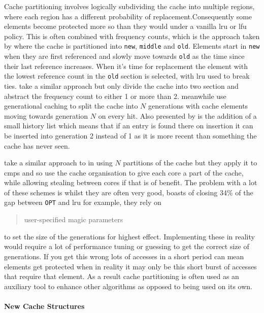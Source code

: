 Cache partitioning involves logically subdividing the cache into multiple regions, where each region has a different probability of replacement.Consequently some elements become protected more so than they would under a vanilla \gls{lru} or \gls{lfu} policy. This is often combined with frequency counts, which is the approach taken by \citet{robinsonDataCacheManagement1990} where the cache is partitioned into \texttt{new}, \texttt{middle} and \texttt{old}. Elements start in \texttt{new} when they are first referenced and slowly move towards \texttt{old} as the time since their last reference increases. When it's time for replacement the element with the lowest reference count in the \texttt{old} section is selected, with \gls{lru} used to break ties. \citet{karedlaCachingStrategiesImprove1994} take a similar approach but only divide the cache into two section and abstract the frequency count to either 1 or more than 2. \citet{osawaGenerationalReplacementSchemes1997} meanwhile use generational caching to split the cache into $N$ generations with cache elements moving towards generation $N$ on every hit. Also presented by \citeauthor{osawaGenerationalReplacementSchemes1997} is the addition of a small history list which means that if an entry is found there on insertion it can be inserted into generation 2 instead of 1 as it is more recent than something the cache has never seen. 

\citet{juanImprovedMulticoreShared2012} take a similar approach to \citeauthor{osawaGenerationalReplacementSchemes1997} in using $N$ partitions of the cache but they apply it to \gls{cmp}s and so use the cache organisation to give each core a part of the cache, while allowing stealing between cores if that is of benefit. The problem with a lot of these schemes is whilst they are often very good, \citet{robinsonDataCacheManagement1990} boasts of closing 34\% of the gap between \texttt{OPT} and \gls{lru} for example, they rely on  \blockcquote{bansalCARClockAdaptive2004}{user-specified magic parameters} to set the size of the generations for highest effect. Implementing these in reality would require a lot of performance tuning or guessing to get the correct size of generations. If you get this wrong lots of accesses in a short period can mean elements get protected when in reality it may only be this short burst of accesses that require that element. As a result cache partitioning is often used as an auxiliary tool to enhance other algorithms as opposed to being used on its own.

\paragraph{New Cache Structures}

